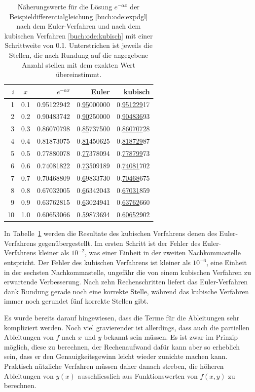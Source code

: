 \begin{table}
\centering
\begin{tabular}{|r|c|r|r|r|}
\hline
$i$&$x$&$e^{-\alpha x}$&Euler&kubisch\\
\hline
 1 & 0.1 & 0.95122942 & 0.\underline{95}000000 & 0.\underline{951229}17 \\
 2 & 0.2 & 0.90483742 & 0.\underline{90}250000 & 0.\underline{904836}93 \\
 3 & 0.3 & 0.86070798 & 0.\underline{85}737500 & 0.\underline{860707}28 \\
 4 & 0.4 & 0.81873075 & 0.\underline{81}450625 & 0.\underline{818729}87 \\
 5 & 0.5 & 0.77880078 & 0.\underline{77}378094 & 0.\underline{778799}73 \\
 6 & 0.6 & 0.74081822 & 0.\underline{73}509189 & 0.\underline{74081}702 \\
 7 & 0.7 & 0.70468809 & 0.\underline{6}9833730 & 0.\underline{70468}675 \\
 8 & 0.8 & 0.67032005 & 0.\underline{6}6342043 & 0.\underline{67031}859 \\
 9 & 0.9 & 0.63762815 & 0.\underline{6}3024941 & 0.\underline{63762}660 \\
10 & 1.0 & 0.60653066 & 0.\underline{5}9873694 & 0.\underline{60652}902 \\
\hline
\end{tabular}
\caption{Näherungswerte für die Lösung $e^{-\alpha x}$ der
Beispieldifferentialgleichung \eqref{buch:ode:expdgl} nach dem Euler-Verfahren
und nach dem kubischen Verfahren \eqref{buch:ode:kubisch} mit einer
Schrittweite von 0.1. Unterstrichen ist jeweils die Stellen, die nach
Rundung auf die angegebene Anzahl stellen mit dem exakten Wert übereinstimmt.
\label{buch:ode:euler-kubisch}}
\end{table}%
In Tabelle~\ref{buch:ode:euler-kubisch} werden die Resultate des
kubischen Verfahrens denen des Euler-Verfahrens gegenübergestellt.
Im ersten Schritt ist der Fehler des Euler-Verfahrens kleiner als $10^{-2}$,
was einer Einheit in der zweiten Nachkommastelle entspricht.
Der Fehler des kubischen Verfahrens ist kleiner als $10^{-6}$, eine
Einheit in der sechsten Nachkommastelle, ungefähr die von einem
kubischen Verfahren zu erwartende Verbesserung.
Nach zehn Rechenschritten liefert das Euler-Verfahren dank Rundung
gerade noch eine korrekte Stelle, während das kubische Verfahren immer noch
gerundet fünf korrekte Stellen gibt.

Es wurde bereits darauf hingewiesen, dass die Terme für die Ableitungen
sehr kompliziert werden.
Noch viel gravierender ist allerdings, dass auch die partiellen Ableitungen
von $f$ nach $x$ und $y$ bekannt sein müssen.
Es ist zwar im Prinzip möglich, diese zu berechnen, der Rechenaufwand 
dafür kann aber so erheblich sein, dass er den Genauigkeitsgewinn
leicht wieder zunichte machen kann.
Praktisch nützliche Verfahren müssen daher danach streben,
die höheren Ableitungen von $y(x)$ ausschliesslich aus Funktionswerten
von $f(x,y)$ zu berechnen.

